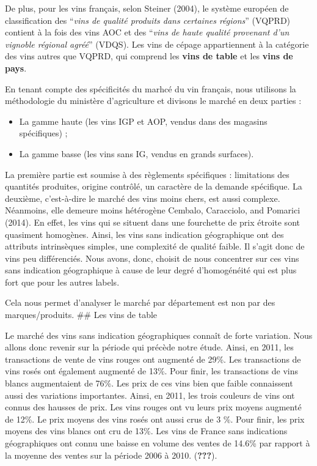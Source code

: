 \documentclass[11pt,]{article}
\providecommand{\tightlist}{%
  \setlength{\itemsep}{0pt}\setlength{\parskip}{0pt}}
\begin{document}
De plus, pour les vins français, selon Steiner (2004), le système
européen de classification des ``\emph{vins de qualité produits dans
certaines régions}'' (VQPRD) contient à la fois des vins AOC et des
``\emph{vins de haute qualité provenant d'un vignoble régional agréé}''
(VDQS). Les vins de cépage appartiennent à la catégorie des vins autres
que VQPRD, qui comprend les \textbf{vins de table} et les
\textbf{vins de pays}.

En tenant compte des spécificités du marhcé du vin français, nous
utilisons la méthodologie du ministère d'agriculture et divisons le
marché en deux parties :

\begin{itemize}
\tightlist
\item
  La gamme haute (les vins IGP et AOP, vendus dans des magasins
  spécifiques) ;
\item
  La gamme basse (les vins sans IG, vendus en grands surfaces).
\end{itemize}

La première partie est soumise à des règlements spécifiques :
limitations des quantités produites, origine contrôlé, un caractère de
la demande spécifique. La deuxième, c'est-à-dire le marché des vins
moins chers, est aussi complexe. Néanmoins, elle demeure moins
hétérogène Cembalo, Caracciolo, and Pomarici (2014). En effet, les vins
qui se situent dans une fourchette de prix étroite sont quasiment
homogènes. Ainsi, les vins sans indication géographique ont des
attributs intrinsèques simples, une complexité de qualité faible. Il
s'agit donc de vins peu différenciés. Nous avons, donc, choisit de nous
concentrer sur ces vins sans indication géographique à cause de leur
degré d'homogénéité qui est plus fort que pour les autres labels.

Cela nous permet d'analyser le marché par département est non par des
marques/produits. \#\# Les vins de table

Le marché des vins sans indication géographiques connaît de forte
variation. Nous allons donc revenir sur la période qui précède notre
étude. Ainsi, en 2011, les transactions de vente de vins rouges ont
augmenté de 29\%. Les transactions de vins rosés ont également augmenté
de 13\%. Pour finir, les transactions de vins blancs augmentaient de
76\%. Les prix de ces vins bien que faible connaissent aussi des
variations importantes. Ainsi, en 2011, les trois couleurs de vins ont
connus des hausses de prix. Les vins rouges ont vu leurs prix moyens
augmenté de 12\%. Le prix moyens des vins rosés ont aussi crus de 3 \%.
Pour finir, les prix moyens des vins blancs ont cru de 13\%. Les vins de
France sans indications géographiques ont connu une baisse en volume des
ventes de 14.6\% par rapport à la moyenne des ventes sur la période 2006
à 2010. ({\textbf{???}}).
\end{document}
